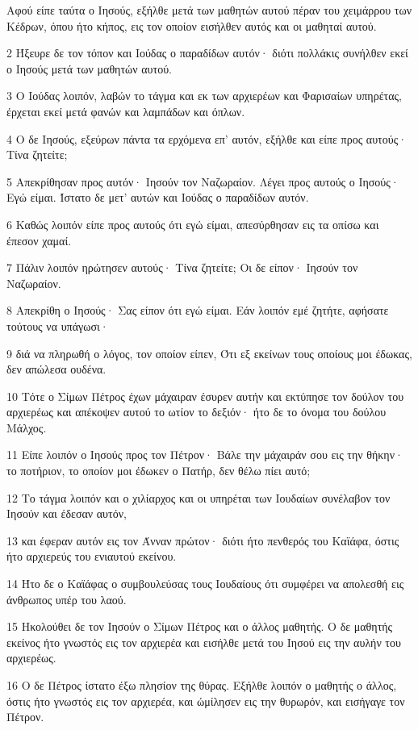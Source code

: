 \par Αφού είπε ταύτα ο Ιησούς, εξήλθε μετά των μαθητών αυτού πέραν του χειμάρρου των Κέδρων, όπου ήτο κήπος, εις τον οποίον εισήλθεν αυτός και οι μαθηταί αυτού.
\par 2 Ήξευρε δε τον τόπον και Ιούδας ο παραδίδων αυτόν· διότι πολλάκις συνήλθεν εκεί ο Ιησούς μετά των μαθητών αυτού.
\par 3 Ο Ιούδας λοιπόν, λαβών το τάγμα και εκ των αρχιερέων και Φαρισαίων υπηρέτας, έρχεται εκεί μετά φανών και λαμπάδων και όπλων.
\par 4 Ο δε Ιησούς, εξεύρων πάντα τα ερχόμενα επ' αυτόν, εξήλθε και είπε προς αυτούς· Τίνα ζητείτε;
\par 5 Απεκρίθησαν προς αυτόν· Ιησούν τον Ναζωραίον. Λέγει προς αυτούς ο Ιησούς· Εγώ είμαι. Ίστατο δε μετ' αυτών και Ιούδας ο παραδίδων αυτόν.
\par 6 Καθώς λοιπόν είπε προς αυτούς ότι εγώ είμαι, απεσύρθησαν εις τα οπίσω και έπεσον χαμαί.
\par 7 Πάλιν λοιπόν ηρώτησεν αυτούς· Τίνα ζητείτε; Οι δε είπον· Ιησούν τον Ναζωραίον.
\par 8 Απεκρίθη ο Ιησούς· Σας είπον ότι εγώ είμαι. Εάν λοιπόν εμέ ζητήτε, αφήσατε τούτους να υπάγωσι·
\par 9 διά να πληρωθή ο λόγος, τον οποίον είπεν, Ότι εξ εκείνων τους οποίους μοι έδωκας, δεν απώλεσα ουδένα.
\par 10 Τότε ο Σίμων Πέτρος έχων μάχαιραν έσυρεν αυτήν και εκτύπησε τον δούλον του αρχιερέως και απέκοψεν αυτού το ωτίον το δεξιόν· ήτο δε το όνομα του δούλου Μάλχος.
\par 11 Είπε λοιπόν ο Ιησούς προς τον Πέτρον· Βάλε την μάχαιράν σου εις την θήκην· το ποτήριον, το οποίον μοι έδωκεν ο Πατήρ, δεν θέλω πίει αυτό;
\par 12 Το τάγμα λοιπόν και ο χιλίαρχος και οι υπηρέται των Ιουδαίων συνέλαβον τον Ιησούν και έδεσαν αυτόν,
\par 13 και έφεραν αυτόν εις τον Άνναν πρώτον· διότι ήτο πενθερός του Καϊάφα, όστις ήτο αρχιερεύς του ενιαυτού εκείνου.
\par 14 Ήτο δε ο Καϊάφας ο συμβουλεύσας τους Ιουδαίους ότι συμφέρει να απολεσθή εις άνθρωπος υπέρ του λαού.
\par 15 Ηκολούθει δε τον Ιησούν ο Σίμων Πέτρος και ο άλλος μαθητής. Ο δε μαθητής εκείνος ήτο γνωστός εις τον αρχιερέα και εισήλθε μετά του Ιησού εις την αυλήν του αρχιερέως.
\par 16 Ο δε Πέτρος ίστατο έξω πλησίον της θύρας. Εξήλθε λοιπόν ο μαθητής ο άλλος, όστις ήτο γνωστός εις τον αρχιερέα, και ώμίλησεν εις την θυρωρόν, και εισήγαγε τον Πέτρον.
